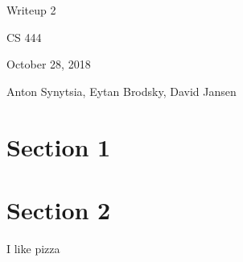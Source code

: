 \documentclass[onecolumn, draftclsnofoot, 10pt, compsoc]{../ThirdParty/IEEEtran}
\begin{document}
\begin{titlepage}
\begin{singlespace}
\centering
\scshape{
    \huge{Writeup 2}\par
    \vspace{.5in}
    \large{CS 444}\par
    \large{October 28, 2018}\par
    \vspace{.5in}
    \large{Anton Synytsia, Eytan Brodsky, David Jansen}\par
    \vspace{.5in}
    \vfill
}
\end{singlespace}
\end{titlepage}
\newpage
{}
\tableofcontents
\clearpage

\section{Section 1}
\section{Section 2}
I like pizza \cite[p.345]{freebsd}

\clearpage
\medskip


\end{document}
